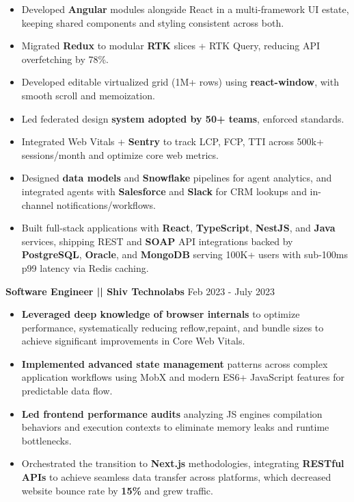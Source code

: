 \documentclass[a4paper]{article}
\begin{document}
\begin{itemize}
\item {Developed \textbf{Angular} modules alongside React in a multi-framework UI estate, keeping shared components and styling consistent across both.}
\item {Migrated \textbf{Redux} to modular \textbf{RTK} slices + RTK Query, reducing API overfetching by 78\%.}
\item {Developed editable virtualized grid (1M+ rows) using \textbf{react-window}, with smooth scroll and memoization.}
\item {Led federated design \textbf{system adopted by 50+ teams}, enforced standards.}
\item {Integrated Web Vitals + \textbf{Sentry} to track LCP, FCP, TTI across 500k+ sessions/month and optimize core web metrics.}
\item {Designed \textbf{data models} and \textbf{Snowflake} pipelines for agent analytics, and integrated agents with \textbf{Salesforce} and \textbf{Slack} for CRM lookups and in-channel notifications/workflows.}
\item {Built full-stack applications with \textbf{React}, \textbf{TypeScript}, \textbf{NestJS}, and \textbf{Java} services, shipping REST and \textbf{SOAP} API integrations backed by \textbf{PostgreSQL}, \textbf{Oracle}, and \textbf{MongoDB} serving 100K+ users with sub-100ms p99 latency via Redis caching.}
\end{itemize}




\vspace{4pt}
\textbf{Software Engineer || Shiv Technolabs}
\hfill Feb 2023 - July 2023
\begin{itemize}
\vspace{1pt}

\item {\textbf{Leveraged deep knowledge of browser internals} to optimize performance, systematically reducing reflow,repaint, and bundle sizes to achieve significant improvements in Core Web Vitals.}
\item {\textbf{Implemented advanced state management} patterns across complex application workflows using MobX and modern ES6+ JavaScript features for predictable data flow.}
\item {\textbf{Led frontend performance audits} analyzing JS engines compilation behaviors and execution contexts to eliminate memory leaks and runtime bottlenecks.}
\item {Orchestrated the transition to \textbf{Next.js} methodologies, integrating \textbf{RESTful APIs} to achieve seamless data transfer across platforms, which decreased website bounce rate by \textbf{15\%} and grew traffic.}
\end{itemize}
\end{document}
